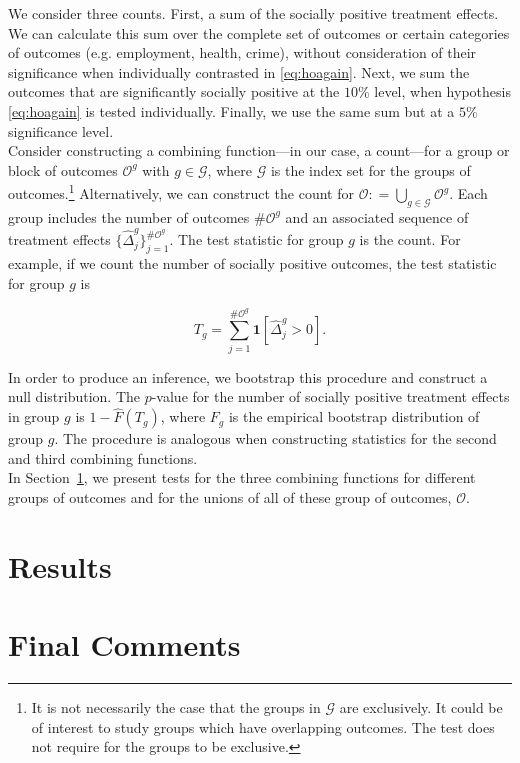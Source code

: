 \noindent We consider three counts. First, a sum of the socially positive treatment effects. We can calculate this sum over the complete set of outcomes or certain categories of outcomes (e.g. employment, health, crime), without consideration of their significance when individually contrasted in \eqref{eq:hoagain}. Next, we sum the outcomes that are significantly socially positive at the $10\%$ level, when hypothesis \eqref{eq:hoagain} is tested individually. Finally, we use the same sum but at a $5\%$ significance level.\\

\noindent Consider constructing a combining function---in our case, a count---for a group or block of outcomes $\mathcal{O}^g$ with $g \in \mathcal{G}$, where $\mathcal{G}$ is the index set for the groups of outcomes.\footnote{It is not necessarily the case that the groups in $\mathcal{G}$ are exclusively. It could be of interest to study groups which have overlapping outcomes. The test does not require for the groups to be exclusive.} Alternatively, we can construct the count for $\mathcal{O} : =  \bigcup \limits _{g \in \mathcal{G}} \mathcal{O}^g$. Each group includes the number of outcomes $\# \mathcal{O}^g$ and an associated sequence of treatment effects $\{ \widehat{\Delta}_{j}^{g} \}_{j = 1}^{\# \mathcal{O}^g}$. The test statistic for group $g$ is the count. For example, if we count the number of socially positive outcomes, the test statistic for group $g$ is 

\begin{equation}
T_{g} = \sum _{j=1}^{\# \mathcal{O}^g} \mathbf{1} \left[ \widehat{\Delta}_{j}^{g} > 0\right]. 
\end{equation} 

\noindent In order to produce an inference, we bootstrap this procedure and construct a null distribution. The $p$-value for the number of socially positive treatment effects in group $g$ is $1 - \widehat{F} \left( T_{g} \right)$, where $ F_{g}$ is the empirical bootstrap distribution of group $g$. The procedure is analogous when constructing statistics for the second and third combining functions.\\

\noindent In Section~\ref{section:results}, we present tests for the three combining functions for different groups of outcomes and for the unions of all of these group of outcomes, $\mathcal{O}$.

\section{Results} \label{section:results}

\section{Final Comments} \label{section:conclusion}

\clearpage
\singlespace



 
